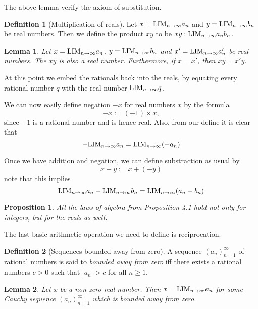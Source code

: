\documentclass[
]{book}
\newtheorem{lemma}{Lemma}[chapter]
\newtheorem{proposition}{Proposition}[chapter]
\theoremstyle{definition}
\newtheorem{definition}{Definition}[chapter]
\theoremstyle{definition}
\theoremstyle{definition}
\theoremstyle{definition}
\theoremstyle{remark}
\begin{document}
The above lemma verify the axiom of substitution.

\begin{definition}[Multiplication of reals]
Let \(x={\rm LIM}_{n\to \infty}a_n\) and \(y={\rm LIM}_{n\to \infty}b_n\) be real numbers. Then we define the product \(xy\) to be \(xy:{\rm LIM}_{n\to \infty}a_n b_n\).
\end{definition}

\begin{lemma}
Let \(x={\rm LIM}_{n\to \infty}a_n\), \(y={\rm LIM}_{n\to \infty}b_n\) and \(x'={\rm LIM}_{n\to \infty}a_n'\) be real numbers. The \(xy\) is also a real number. Furthermore, if \(x=x'\), then \(xy=x'y\).
\end{lemma}

At this point we embed the rationals back into the reals, by equating every rational number \(q\) with the real number \({\rm LIM}_{n\to \infty}q\).

We can now easily define negation \(-x\) for real numbers \(x\) by the formula
\[
-x:=(-1)\times x,
\]
since \(-1\) is a rational number and is hence real. Also, from our define it is clear that
\[
-{\rm LIM}_{n\to \infty}a_n = {\rm LIM}_{n\to \infty}(-a_n)
\]

Once we have addition and negation, we can define substraction as usual by
\[
x-y:= x+(-y)
\]
note that this implies
\[
{\rm LIM}_{n\to \infty}a_n-{\rm LIM}_{n\to \infty}b_n = {\rm LIM}_{n\to \infty}(a_n-b_n)
\]

\begin{proposition}
All the laws of algebra from Proposition 4.1 hold not only for integers, but for the reals as well.
\end{proposition}

The last basic arithmetic operation we need to define is reciprocation.

\begin{definition}[Sequences bounded away from zero]
A sequence \((a_n)_{n=1}^{\infty}\) of rational numbers is said to \emph{bounded away from zero} iff there exists a rational numbers \(c>0\) such that \(|a_n|>c\) for all \(n\geq 1\).
\end{definition}

\begin{lemma}
\protect\hypertarget{lem:basic}{}\label{lem:basic}Let \(x\) be a non-zero real number. Then \(x={\rm LIM}_{n\to \infty}a_n\) for some Cauchy sequence \((a_n)_{n=1}^{\infty}\) which is bounded away from zero.
\end{lemma}
\end{document}
